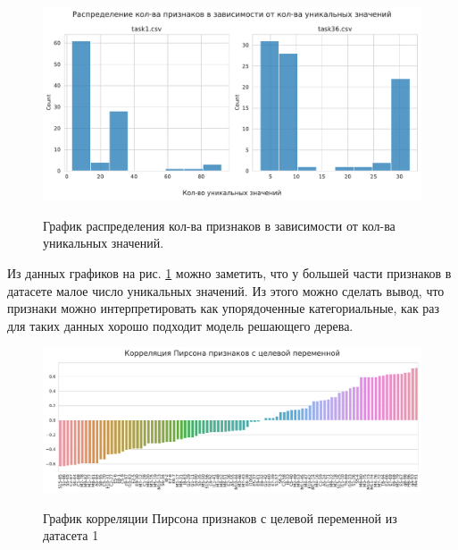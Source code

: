 \documentclass{article}
\begin{document}
\begin{figure}[h]
	\begin{center}
		\begin{minipage}[h]{0.95\linewidth}
			{\includegraphics[width=1.0\linewidth]{../figures/dists.pdf}}	
		\end{minipage}
	\end{center}
	
	\caption{График распределения кол-ва признаков в зависимости от кол-ва уникальных значений. }
	
	\label{ris:image1}
	
\end{figure}

Из данных графиков на рис. \ref{ris:image1} можно заметить, что у большей части признаков в датасете малое число уникальных значений. Из этого можно сделать вывод, что признаки можно интерпретировать как упорядоченные категориальные, как раз для таких данных хорошо подходит модель решающего дерева.


\begin{figure}[h]
	\centering
	
	\begin{minipage}[h]{\linewidth}
		{\includegraphics[width=1.0\linewidth]{../figures/corr_task1.pdf}}	
	\end{minipage}
	
	\caption{График корреляции Пирсона признаков с целевой переменной из датасета 1 }
	\label{ris:image2}
\end{figure}
\end{document}
